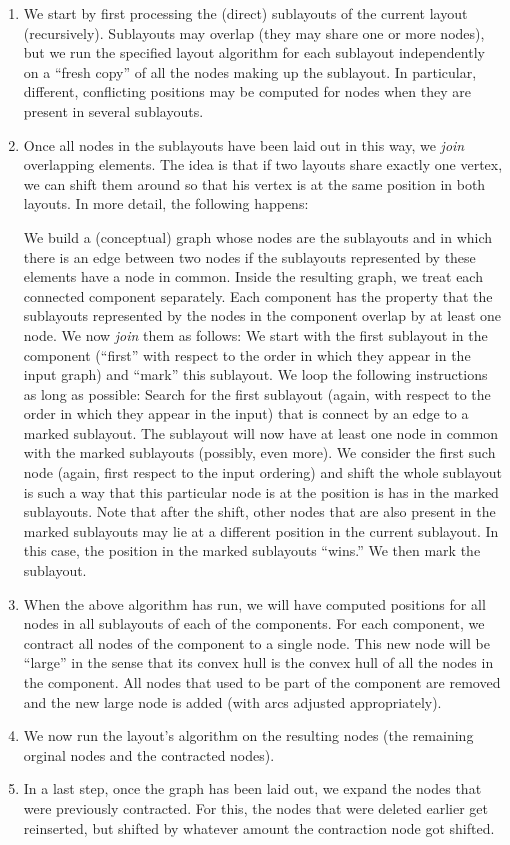 \begin{enumerate} 
\item We start by first processing the (direct) sublayouts of the
  current layout (recursively). Sublayouts may overlap (they may share
  one or more nodes), but we run the specified layout algorithm for
  each sublayout independently on a ``fresh copy'' of all the nodes
  making up the sublayout. In particular, different, conflicting
  positions may be computed for nodes when they are present in several
  sublayouts. 
\item Once all nodes in the sublayouts have been laid out in this way,
  we \emph{join} overlapping elements. The idea is that if two layouts
  share exactly one vertex, we can shift them around so that his
  vertex is at the same position in both layouts. In more detail, the
  following happens:

  We build a (conceptual) graph whose nodes are the sublayouts and in
  which there is an edge between two nodes if the sublayouts
  represented by these elements have a node in common.
  Inside the resulting graph, we treat each connected component
  separately. Each component has the property that the sublayouts
  represented by the nodes in the component overlap by at least one
  node. We now \emph{join} them as follows: We start with the first
  sublayout in the component (``first'' with respect to the order in
  which they appear in the input graph) and ``mark'' this
  sublayout. We loop the following instructions as long as possible:
  Search for the first sublayout (again, with respect to the order in
  which they appear in the input) that is connect by an edge to a
  marked sublayout. The sublayout will now have at least one node in
  common with the marked sublayouts (possibly, even more). We
  consider the first such node (again, first respect to the input
  ordering) and shift the whole sublayout is such a way that this
  particular node is at the position is has in the marked
  sublayouts. Note that after the shift, other nodes that are also
  present in the marked sublayouts may lie at a different position in
  the current sublayout. In this case, the position in the marked
  sublayouts ``wins.'' We then mark the sublayout.
\item When the above algorithm has run, we will have computed
  positions for all nodes in all sublayouts of each of the
  components. For each component, we contract all
  nodes of the component to a single node. This new 
  node will be ``large'' in the sense that its convex hull is the
  convex hull of all the nodes in the component. All nodes that used
  to be part of the component are removed and the new large node is
  added (with arcs adjusted appropriately). 
\item We now run the layout's algorithm on the resulting nodes
  (the remaining orginal nodes and the contracted nodes).
\item In a last step, once the graph has been laid out, we expand the
  nodes that were previously contracted. For this, the 
  nodes that were deleted earlier get reinserted, but shifted by
  whatever amount the contraction node got shifted.
\end{enumerate}


